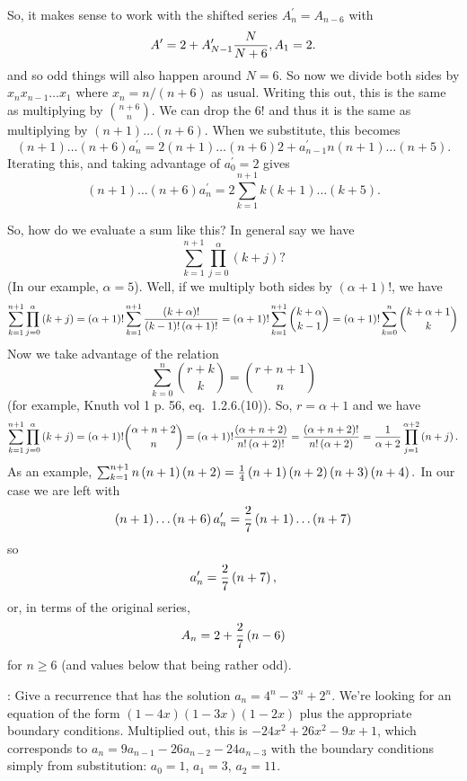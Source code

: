 So, it makes sense to work with the shifted series $A^{\prime}_n = A_{n-6}$
with
$$
 A^{\prime} = 2 + A^{\prime}_{N-1} {N \over N + 6}, A_1 = 2 .
$$
and so odd things will also happen around $N = 6$.  
So now we divide both sides by $x_n x_{n-1} \ldots x_1$ where
$x_n = n / \left(n + 6\right)$ as usual.  Writing this out, this is 
the same as multiplying by $n + 6 \choose n$.  We can drop the $6!$
and thus it is the same as multiplying by $\left(n + 1\right)\ldots\left(n+6\right)$.
When we substitute, this becomes
$$
 \left(n+1\right)\ldots\left(n+6\right) a^{\prime}_n = 2 \left(n+1\right)\ldots
 \left(n+6\right) 2 + a^{\prime}_{n-1} n \left(n+1\right)\ldots\left(n+5\right).
$$
Iterating this, and taking advantage of $a^{\prime}_0 = 2$ gives
$$
\left(n+1\right)\ldots\left(n+6\right) a^{\prime}_n = 2 \sum_{k=1}^{n+1}
k \left(k + 1\right)\ldots\left(k+5\right).
$$

So, how do we evaluate a sum like this?  In general say we have
$$
 \sum_{k=1}^{n+1} \prod_{j=0}^{\alpha} \left(k + j\right)?
$$
(In our example, $\alpha = 5$).  Well, if we multiply both sides by 
$\left(\alpha + 1\right) !$, we have
$$
 \sum_{k=1}^{n+1} \prod_{j=0}^{\alpha} \left(k + j\right) =
 \left(\alpha + 1\right)! \sum_{k=1}^{n+1} {\left(k + \alpha\right)!
   \over \left(k - 1\right)! \left(\alpha + 1\right)!} =
    \left(\alpha + 1\right)! \sum_{k=1}^{n+1} {k + \alpha \choose k - 1}
     = \left(\alpha + 1\right)! \sum_{k=0}^{n} {k + \alpha + 1 \choose k}
$$
Now we take advantage of the relation
$$
 \sum_{k=0}^n {r + k \choose k} = {r + n + 1 \choose n}
$$
(for example, Knuth vol 1 p. 56, eq.~1.2.6.(10)).  So, $r=\alpha + 1$
and we have
$$
  \sum_{k=1}^{n+1} \prod_{j=0}^{\alpha} \left(k + j\right) =
  \left(\alpha + 1\right)! {\alpha + n + 2 \choose n} =
  \left(\alpha + 1\right)! {\left(\alpha + n + 2\right) \over n! \left(\alpha + 2\right)!} =
  { \left(\alpha + n + 2\right)! \over n! \left(\alpha + 2\right)}
  = {1 \over \alpha + 2} \prod_{j=1}^{\alpha + 2} \left(n + j\right).
$$
As an example, $\sum_{k=1}^{n+1} n \left(n + 1\right) \left(n + 2\right)
 = {1 \over 4} \left(n + 1\right)\left(n + 2\right) \left(n + 3\right) \left(n + 4\right).$
 In our case we are left with
$$
\left(n+1\right)\ldots\left(n+6\right) a^{\prime}_n = {2 \over 7}
\left(n + 1\right) \ldots \left(n + 7\right)
$$
so
$$ 
 a^{\prime}_n = {2 \over 7} \left(n + 7\right),
$$
or, in terms of the original series,
$$
 A_n  = 2 + {2 \over 7} \left(n - 6\right)
$$
for $n \ge 6$ (and values below that being rather odd).

: Give a recurrence
that has the solution $a_n = 4^n - 3^n + 2^n$.\hfil\break
We're looking for an equation of the form $\left(1 - 4 x\right)
\left(1 - 3 x\right) \left(1 - 2 x\right)$ plus the appropriate boundary
conditions.  Multiplied out, this is $-24 x^2 + 26 x^2 - 9 x + 1$,
which corresponds to $a_n = 9 a_{n-1} - 26 a_{n-2} - 24 a_{n-3}$
with the boundary conditions simply from substitution: $a_0 = 1$,
$a_1 = 3$, $a_2 = 11$.

